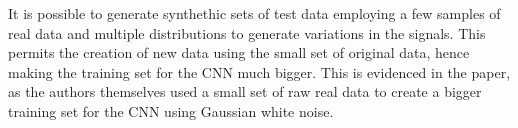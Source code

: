 \documentclass[a4paper,10pt]{article}
\begin{document}
It is possible to generate synthethic sets of test data employing a few samples of real data and multiple distributions to generate variations in the signals.
This permits the creation of new data using the small set of original data, hence making the training set for the CNN much bigger.
This is evidenced in the paper, as the authors themselves used a small set of raw real data to create a bigger training set for the CNN using Gaussian white noise.



% 
\end{document}

